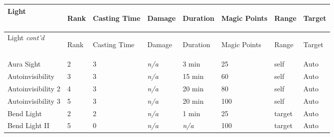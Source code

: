 \documentclass[twoside]{book}
\begin{document}
\begin{longtable}{p{1.25in}p{2em}p{1.5em}p{4em}p{4em}lp{4em}p{4em}} 
  Light& \begin{turn}{70}{Rank}\end{turn}
          & \begin{turn}{70}{Casting Time}\end{turn}
          & \begin{turn}{70}{Damage}\end{turn}
          & \begin{turn}{70}{Duration}\end{turn}
          & \begin{turn}{70}{Magic Points}\end{turn}
          & \begin{turn}{70}{Range}\end{turn}
          & \begin{turn}{70}{Target}\end{turn}
          \\
  \hline
  \hline
  \endfirsthead
  Light \textit{cont'd}
        & \begin{turn}{70}{Rank}\end{turn}
          & \begin{turn}{70}{Casting Time}\end{turn}
          & \begin{turn}{70}{Damage}\end{turn}
          & \begin{turn}{70}{Duration}\end{turn}
          & \begin{turn}{70}{Magic Points}\end{turn}
          & \begin{turn}{70}{Range}\end{turn}
          & \begin{turn}{70}{Target}\end{turn}
           \\
  \hline
  \endhead
\raggedright Aura Sight&2&3&\textit{n/a}&3 min&25&self&Auto\tabularnewline
      \raggedright Autoinvisibility&3&3&\textit{n/a}&15 min&60&self&Auto\tabularnewline
      \raggedright Autoinvisibility 2&4&3&\textit{n/a}&20 min&80&self&Auto\tabularnewline
      \raggedright Autoinvisibility 3&5&3&\textit{n/a}&20 min&100&self&Auto\tabularnewline
      \raggedright Bend Light&2&2&\textit{n/a}&1 min&25&target&Auto\tabularnewline
      \raggedright Bend Light II&5&0&\textit{n/a}&\textit{n/a}&100&target&Auto\tabularnewline

\end{longtable}
\end{document}
